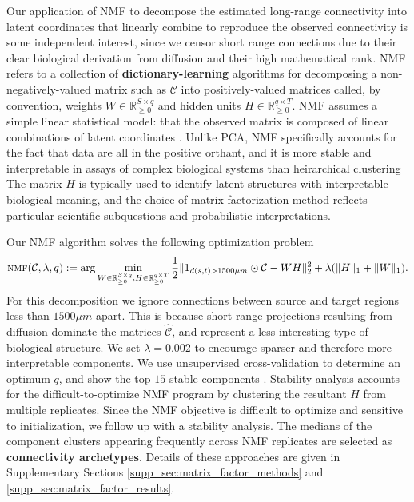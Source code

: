 Our application of NMF to decompose the estimated long-range connectivity into latent coordinates that linearly combine to reproduce the observed connectivity is some independent interest, since we censor short range connections due to their clear biological derivation from diffusion and their high mathematical rank.
NMF refers to a collection of \textbf{dictionary-learning} algorithms for decomposing a non-negatively-valued matrix such as $\mathcal C $ into positively-valued matrices called, by convention, weights $W \in \mathbb R^{S \times q}_{\geq 0}$ and hidden units $H \in \mathbb R^{q  \times T}_{\geq 0}$.
NMF assumes a simple linear statistical model: that the observed matrix is composed of linear combinations of latent coordinates \citep{Devarajan2008-hd}.
Unlike PCA, NMF specifically accounts for the fact that data are all in the positive orthant, and it is more stable and interpretable in assays of complex biological systems than heirarchical clustering \citep{Brunet2004-gi}
The matrix $H$ is typically used to identify latent structures with interpretable biological meaning, and the choice of matrix factorization method reflects particular scientific subquestions and probabilistic interpretations. 

Our NMF algorithm solves the following optimization problem
\begin{eqnarray*}
\label{eq:nmf}
\textsc{nmf}(\mathcal C, \lambda, q) := \arg \min_{W\in \mathbb R^{S \times q}_{\geq 0}, H \in \mathbb R^{q  \times T}_{\geq 0}} \frac{1}{2}\| 1_{d(s,t) > 1500 \mu m} \odot \mathcal C - WH\|_2^2  + \lambda  (\|H \|_1 + \|W \|_1) .
\end{eqnarray*}
For this decomposition we ignore connections between source and target regions less than  $1500 \mu m$ apart.
This is because short-range projections resulting from diffusion dominate the matrices $\hat {\mathcal C}$, and represent a less-interesting type of biological structure.
We set $\lambda = 0.002$ to encourage sparser and therefore more interpretable components.
We use unsupervised cross-validation to determine an optimum $q$, and show the top $15$ stable components \citep{Perry2009-ia}.
Stability analysis accounts for the difficult-to-optimize NMF program by clustering the resultant $H$ from multiple replicates.
Since the NMF objective is difficult to optimize and sensitive to initialization, we follow up with a stability analysis.
The medians of the component clusters appearing frequently across NMF replicates are selected as \textbf{connectivity archetypes}.
Details of these approaches are given in Supplementary Sections \ref{supp_sec:matrix_factor_methods} and \ref{supp_sec:matrix_factor_results}.